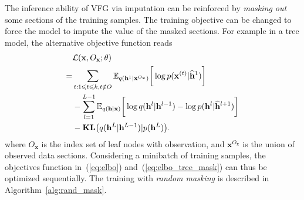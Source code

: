 \documentclass[sigconf, anonymous, review]{acmart}
\theoremstyle{plain}
\theoremstyle{definition}
\theoremstyle{remark}
\begin{document}
The inference ability of VFG via imputation can be reinforced by \emph{masking out} some sections of the training samples. 
The training objective can be changed to force the model to impute the value of the masked sections. 
For example in a tree model, the alternative objective function reads
{\small
\begin{align}  \label{eq:elbo_tree_mask}
& \mathcal{L}(\mathbf{x}, O_{\mathbf{x}}; \theta) \\ \notag
= & \sum_{t: 1\leqslant t \leqslant k, t\notin O}
 \mathbb{E}_{q(\mathbf{h}^{1}|\mathbf{x}^{O_{\mathbf{x}}} )} \bigg[ \log p( \mathbf{x}^{(t)}|  \widehat{\mathbf{h}}^{1})   \bigg] \\ \notag
 &- \sum_{l=1}^{L-1}  \mathbb{E}_{q(\mathbf{h}|\mathbf{x})} \bigg[ \log q(\mathbf{h}^{l}|\mathbf{h}^{l-1}) - \log p( \mathbf{h}^{l}|  \widehat{\mathbf{h}}^{l+1})   \bigg]    
\\ \notag
& -  \textbf{\text{KL}}\big(q(\mathbf{h}^L | \mathbf{h}^{L-1} )   | p(\mathbf{h}^L)  \big).
\end{align} }
where $O_{\mathbf{x}}$ is the index set of leaf nodes  with observation, and $\mathbf{x}^{O_{\mathbf{x}}}$ is the union of observed data sections. 
Considering a minibatch of training samples, the objectives function in~(\ref{eq:elbo})
and~(\ref{eq:elbo_tree_mask}) can thus be optimized sequentially. 
The training with \emph{random masking} is described in Algorithm~\ref{alg:rand_mask}. 
\end{document}
